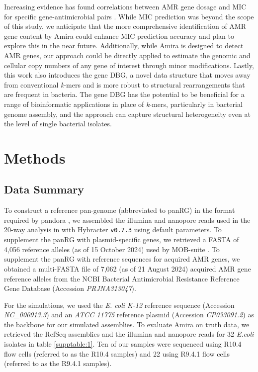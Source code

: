 Increasing evidence has found correlations between AMR gene dosage and MIC for specific gene-antimicrobial pairs \cite{10.1128/aac.02026-19, 10.1128/AAC.46.10.3334-3336.2002}. While MIC prediction was beyond the scope of this study, we anticipate that the more comprehensive identification of AMR gene content by Amira could enhance MIC prediction accuracy and plan to explore this in the near future. Additionally, while Amira is designed to detect AMR genes, our approach could be directly applied to estimate the genomic and cellular copy numbers of any gene of interest through minor modifications. Lastly, this work also introduces the gene DBG, a novel data structure that moves away from conventional \textit{k}-mers and is more robust to structural rearrangements that are frequent in bacteria. The gene DBG has the potential to be beneficial for a range of bioinformatic applications in place of \textit{k}-mers, particularly in bacterial genome assembly, and the approach can capture structural heterogeneity even at the level of single bacterial isolates. 

\section*{Methods}

\subsection*{Data Summary}

To construct a reference pan-genome (abbreviated to panRG) in the format required by pandora \cite{pandora}, we assembled the illumina and nanopore reads used in the 20-way analysis in \cite{pandora} with Hybracter \texttt{v0.7.3} \cite{Bouras2024} using default parameters. To supplement the panRG with plasmid-specific genes, we retrieved a FASTA of 4,056 reference alleles (as of 15 October 2024) used by MOB-suite \cite{10.1099/mgen.0.000206}. To supplement the panRG with reference sequences for acquired AMR genes, we obtained a multi-FASTA file of 7,062 (as of 21 August 2024) acquired AMR gene reference alleles
from the NCBI Bacterial Antimicrobial Resistance Reference Gene Database (Accession \textit{PRJNA313047}). 

For the simulations, we used the \textit{E. coli K-12} reference sequence (Accession \textit{NC\_000913.3}) and an \textit{ATCC 11775} reference plasmid (Accession \textit{CP033091.2}) as the backbone for our simulated assemblies. To evaluate Amira on truth data, we retrieved the RefSeq assemblies and the illumina and nanopore reads for 32 \textit{E.coli} isolates in table \ref{supptable:1}. Ten of our samples were sequenced using R10.4 flow cells (referred to as the R10.4 samples) and 22 using R9.4.1 flow cells (referred to as the R9.4.1 samples).

